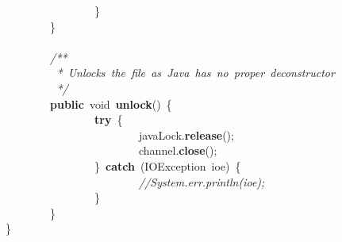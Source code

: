 \mbox{}\ \ \ \ \ \ \ \ \ \ \ \ \ \ \ \ \} \\
\mbox{}\ \ \ \ \ \ \ \ \} \\
\mbox{} \\
\mbox{}\ \ \ \ \ \ \ \ \textit{/**} \\
\mbox{}\textit{\ \ \ \ \ \ \ \ \ *\ Unlocks\ the\ file\ as\ Java\ has\ no\ proper\ deconstructor} \\
\mbox{}\textit{\ \ \ \ \ \ \ \ \ */} \\
\mbox{}\ \ \ \ \ \ \ \ \textbf{public}\ void\ \textbf{unlock}()\ \{ \\
\mbox{}\ \ \ \ \ \ \ \ \ \ \ \ \ \ \ \ \textbf{try}\ \{ \\
\mbox{}\ \ \ \ \ \ \ \ \ \ \ \ \ \ \ \ \ \ \ \ \ \ \ \ javaLock.\textbf{release}(); \\
\mbox{}\ \ \ \ \ \ \ \ \ \ \ \ \ \ \ \ \ \ \ \ \ \ \ \ channel.\textbf{close}(); \\
\mbox{}\ \ \ \ \ \ \ \ \ \ \ \ \ \ \ \ \}\ \textbf{catch}\ (IOException\ ioe)\ \{ \\
\mbox{}\ \ \ \ \ \ \ \ \ \ \ \ \ \ \ \ \ \ \ \ \ \ \ \ \textit{//System.err.println(ioe);} \\
\mbox{}\ \ \ \ \ \ \ \ \ \ \ \ \ \ \ \ \} \\
\mbox{}\ \ \ \ \ \ \ \ \} \\
\mbox{}\} \\

\clearpage
